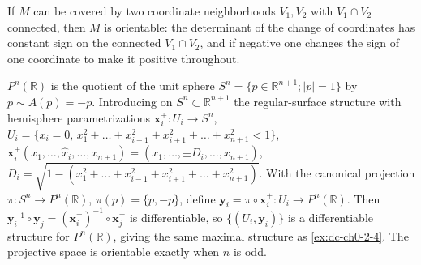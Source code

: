\begin{example}
  \label{ex:dc-ch0-4-5}


  If $M$ can be covered by two coordinate neighborhoods $V_1,V_2$ with
  $V_1\cap V_2$ connected, then $M$ is orientable: the determinant of the change of
  coordinates has constant sign on the connected $V_1\cap V_2$, and if negative one
  changes the sign of one coordinate to make it positive throughout.
\end{example}

\begin{example}
  \label{ex:dc-ch0-4-7}


  $P^n(\mathbb{R})$ is the quotient of the unit sphere $S^n=\{p\in\mathbb{R}^{n+1};
  |p|=1\}$ by $p\sim A(p)=-p$. Introducing on $S^n\subset\mathbb{R}^{n+1}$ the
  regular-surface structure with hemisphere parametrizations
  $\mathbf{x}_i^{\pm}:U_i\to S^n$,
  $U_i=\{x_i=0,\,x_1^2+\dots+x_{i-1}^2+x_{i+1}^2+\dots+x_{n+1}^2<1\}$,
  $\mathbf{x}_i^{\pm}(x_1,\dots,\hat x_i,\dots,x_{n+1})=(x_1,\dots,\pm D_i,\dots,x_{n+1})$,
  $D_i=\sqrt{1-(x_1^2+\dots+x_{i-1}^2+x_{i+1}^2+\dots+x_{n+1}^2)}$. With the
  canonical projection $\pi:S^n\to P^n(\mathbb{R})$, $\pi(p)=\{p,-p\}$, define
  $\mathbf{y}_i=\pi\circ\mathbf{x}_i^+:U_i\to P^n(\mathbb{R})$. Then
  $\mathbf{y}_i^{-1}\circ\mathbf{y}_j=(\mathbf{x}_i^+)^{-1}\circ\mathbf{x}_j^+$ is
  differentiable, so $\{(U_i,\mathbf{y}_i)\}$ is a differentiable structure for
  $P^n(\mathbb{R})$, giving the same maximal structure as \cref{ex:dc-ch0-2-4}.
  The projective space is orientable exactly when $n$ is odd.
\end{example}

